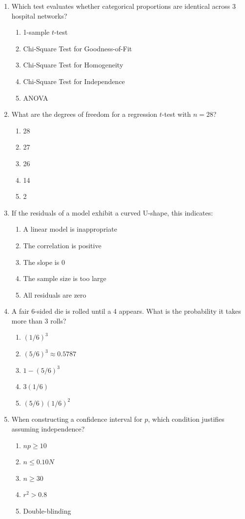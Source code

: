 \begin{enumerate}[resume, leftmargin=1.5em]
  \item Which test evaluates whether categorical proportions are identical across 3 hospital networks?
  \begin{enumerate}[label=(\Alph*)]
    \item 1-sample $t$-test \item Chi-Square Test for Goodness-of-Fit \item Chi-Square Test for Homogeneity \item Chi-Square Test for Independence \item ANOVA
  \end{enumerate}

  \item What are the degrees of freedom for a regression $t$-test with $n = 28$?
  \begin{enumerate}[label=(\Alph*)]
    \item 28 \item 27 \item 26 \item 14 \item 2
  \end{enumerate}

  \item If the residuals of a model exhibit a curved U-shape, this indicates:
  \begin{enumerate}[label=(\Alph*)]
    \item A linear model is inappropriate \item The correlation is positive \item The slope is 0 \item The sample size is too large \item All residuals are zero
  \end{enumerate}

  \item A fair 6-sided die is rolled until a 4 appears. What is the probability it takes more than 3 rolls?
  \begin{enumerate}[label=(\Alph*)]
    \item $(1/6)^3$ \item $(5/6)^3 \approx 0.5787$ \item $1 - (5/6)^3$ \item $3(1/6)$ \item $(5/6)(1/6)^2$
  \end{enumerate}

  \item When constructing a confidence interval for $p$, which condition justifies assuming independence?
  \begin{enumerate}[label=(\Alph*)]
    \item $np \ge 10$ \item $n \le 0.10N$ \item $n \ge 30$ \item $r^2 > 0.8$ \item Double-blinding
  \end{enumerate}


\end{enumerate}
